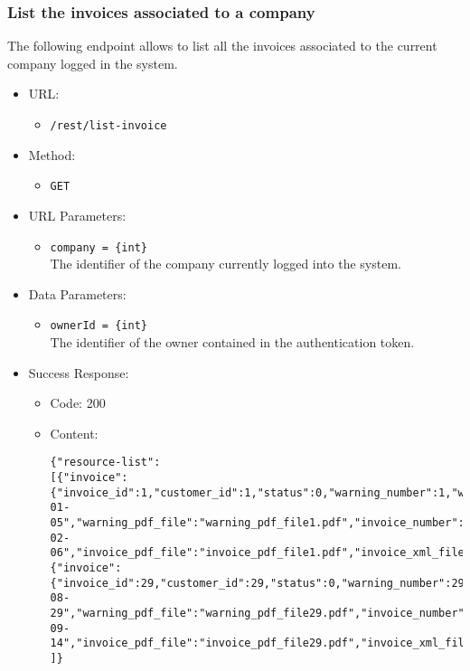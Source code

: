 \subsubsection*{List the invoices associated to a company}

The following endpoint allows to list all the invoices associated to the current company logged in the system.

\begin{itemize}
    
    \item URL: 
    \begin{itemize}
        \item \texttt{/rest/list-invoice}
    \end{itemize}
    
    \item Method: 
    \begin{itemize}
        \item \texttt{GET}
    \end{itemize}
    
    \item URL Parameters: 
    \begin{itemize}
        \item \texttt{company = \{int\}} \\
        The identifier of the company currently logged into the system.
    \end{itemize}
    
    \item Data Parameters: 
    \begin{itemize}
        \item \texttt{ownerId = \{int\}} \\
        The identifier of the owner contained in the authentication token.
    \end{itemize}
    
    \item Success Response: 
    \begin{itemize}
        \item Code: 200
        \item Content:
        \begin{lstlisting}
{"resource-list":
[{"invoice":{"invoice_id":1,"customer_id":1,"status":0,"warning_number":1,"warning_date":"2022-01-05","warning_pdf_file":"warning_pdf_file1.pdf","invoice_number":"1","invoice_date":"2022-02-06","invoice_pdf_file":"invoice_pdf_file1.pdf","invoice_xml_file":"invoice_xml_file1.xml","total":168.3,"discount":15.0,"pension_fund_refund":4.1,"has_stamp":false}},
{"invoice":{"invoice_id":29,"customer_id":29,"status":0,"warning_number":29,"warning_date":"2022-08-29","warning_pdf_file":"warning_pdf_file29.pdf","invoice_number":"29","invoice_date":"2022-09-14","invoice_pdf_file":"invoice_pdf_file29.pdf","invoice_xml_file":"invoice_xml_file29.xml","total":846.8,"discount":75.4,"pension_fund_refund":1.2,"has_stamp":false}}
]}
        \end{lstlisting}    
    \end{itemize}
    

\end{itemize}
